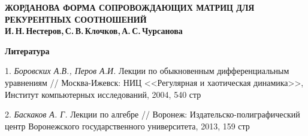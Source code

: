 \documentclass[10pt,a4paper,oneside]{article}
\begin{document}
 
\begin{center}
    \textbf{\LARGE ЖОРДАНОВА ФОРМА СОПРОВОЖДАЮЩИХ МАТРИЦ ДЛЯ РЕКУРЕНТНЫХ СООТНОШЕНИЙ} \\[1em]
    \textbf{И.\,Н.\,Нестеров,\,С.\,В.\,Клочков,\,А.\,С.\,Чурсанова} \\[2em]
\end{center}





\vfill

\smallskip \centerline{\bf Литература}\nopagebreak

1. \textit{ Боровских А.В., Перов А.И.} Лекции по обыкновенным дифференциальным уравнениям // Москва-Ижевск: НИЦ  <<Регулярная и хаотическая динамика>>, Институт компьютерных исследований, 2004, 540 стр

2. \textit{ Баскаков А. Г.} Лекции по алгебре // Воронеж: Издательско-полиграфический центр Воронежского государственного университета, 2013, 159 стр
\end{document}
